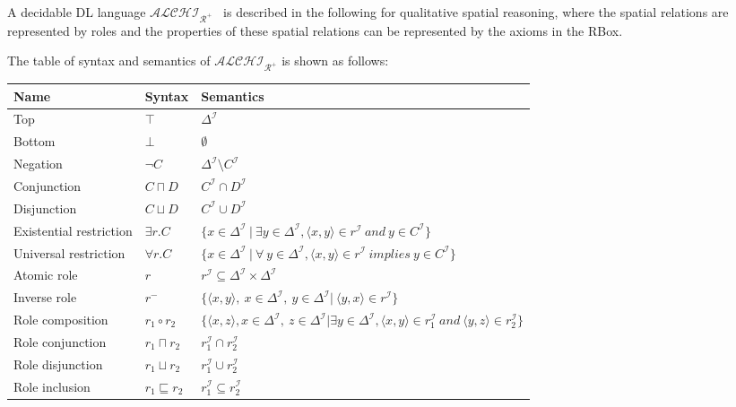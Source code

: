 \documentclass{article}
\begin{document}
A decidable DL language $\mathcal{ALCHI_{R^+}}$~\cite{horrocks1999description} is described in the following for qualitative spatial reasoning, where the spatial relations are 
represented by roles and the properties of these spatial relations can be represented by the axioms in the RBox.

The table of syntax and semantics of $\mathcal{ALCHI_{R^+}}$ is shown as follows:
 \begin{center}
 \begin{table}[H]
    \begin{tabular}{|p{4cm} | p{2cm} | p{10cm}| }
    \hline
      Name & Syntax & Semantics \\ \hline
    Top & $\top$ & $\Delta^\mathcal{I}$ \\
    Bottom & $\bot$ & $\emptyset$ \\ 
    Negation & $\neg C$ & $\Delta^\mathcal{I}\setminus C^\mathcal{I}$ \\ 
    Conjunction & $C\sqcap D$ & $C^\mathcal{I}\cap D^\mathcal{I}$  \\  
    Disjunction & $C\sqcup D$ &  $C^\mathcal{I}\cup D^\mathcal{I}$ \\  
    Existential restriction & $\exists r.C$ & $\{x\in \Delta^\mathcal{I}~|~ \exists y\in \Delta^\mathcal{I}, \langle x,y\rangle \in r^\mathcal{I}~and~y\in C^\mathcal{I}\}$ \\ 
    Universal restriction & $\forall r.C$ & $\{x\in \Delta^\mathcal{I}~|~ \forall~y\in \Delta^\mathcal{I}, \langle x,y\rangle \in r^\mathcal{I}~implies~y\in C^\mathcal{I}\}$ \\ \hline
    Atomic role & $r$ & $r^\mathcal{I}\subseteq \Delta^\mathcal{I} \times \Delta^\mathcal{I}$\\
    Inverse role & $r^-$ & $\{\langle x,y \rangle,~x\in \Delta^\mathcal{I},~y\in \Delta^\mathcal{I} | ~\langle y,x \rangle\in r^\mathcal{I}\}$\\ 
    Role composition & $r_1\circ r_2$ & $\{\langle x,z\rangle, x\in \Delta^\mathcal{I},~z\in \Delta^\mathcal{I}| \exists y\in \Delta^\mathcal{I},\langle x,y \rangle\in r_1^\mathcal{I}~and~\langle y,z\rangle\in r_2^\mathcal{I}\}$\\
    Role conjunction & $r_1\sqcap r_2$ & $r_1^\mathcal{I} \cap r_2^\mathcal{I}$ \\
    Role disjunction & $r_1\sqcup r_2$ & $r_1^\mathcal{I} \cup r_2^\mathcal{I}$ \\
    Role inclusion & $r_1\sqsubseteq r_2$ &  $r_1^\mathcal{I} \subseteq r_2^\mathcal{I}$\\

\end{tabular}
\end{table}
\end{center}
\end{document}
